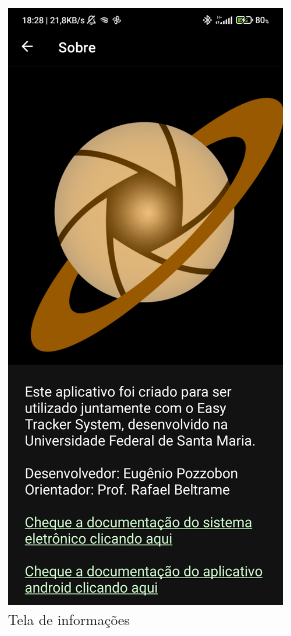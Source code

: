 \begin{figure}[!htb]
	\centering
	\caption{Telas Informativas}
	\begin{subfigure}[b]{0.4\textwidth}
		\centering
		\includegraphics[width=0.8\textwidth]{figuras/desAplicativo/about}
		\caption{Tela de informações}
		\label{about}
	\end{subfigure}
	\hfill
	\begin{subfigure}[b]{0.4\textwidth}
		\centering

\end{subfigure}
\end{figure}
